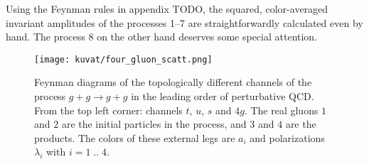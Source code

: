 \documentclass[a4paper, twoside, english, 12pt]{article}
\begin{document}
Using the Feynman rules in appendix TODO, the squared, color-averaged invariant amplitudes of the processes 1--7 are straightforwardly calculated even by hand. The process 8 on the other hand deserves some special attention. 

\begin{figure}[h]
	\centering
	\texttt{[image: kuvat/four\_gluon\_scatt.png]}
	\caption{Feynman diagrams of the topologically different channels of the process $g+g\rightarrow g+g$ in the leading order of perturbative QCD. From the top left corner: channels $t$, $u$, $s$ and $4g$. The real gluons $1$ and $2$ are the initial particles in the process, and $3$ and $4$ are the products. The colors of these external legs are $a_i$ and polarizations $\lambda_i$ with $i=1\;..\;4$.}
	\label{F:four_gluon_scatt}
\end{figure} 
\end{document}
